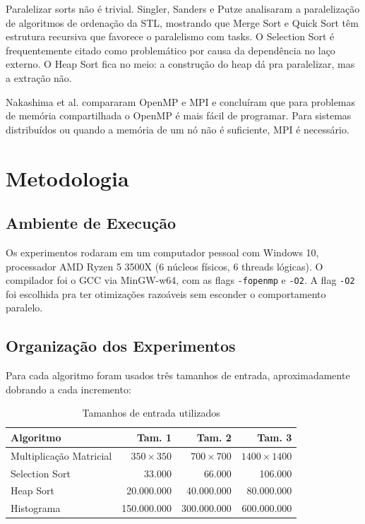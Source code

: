 \documentclass[12pt]{article}
\begin{document}
Paralelizar sorts não é trivial. Singler, Sanders e Putze \cite{singler2007} analisaram a paralelização de algoritmos de ordenação da STL, mostrando que Merge Sort e Quick Sort têm estrutura recursiva que favorece o paralelismo com tasks. O Selection Sort é frequentemente citado como problemático por causa da dependência no laço externo. O Heap Sort fica no meio: a construção do heap dá pra paralelizar, mas a extração não.

Nakashima et al. \cite{nakashima2012} compararam OpenMP e MPI e concluíram que para problemas de memória compartilhada o OpenMP é mais fácil de programar. Para sistemas distribuídos ou quando a memória de um nó não é suficiente, MPI é necessário.

\section{Metodologia}

\subsection{Ambiente de Execução}

Os experimentos rodaram em um computador pessoal com Windows 10, processador AMD Ryzen 5 3500X (6 núcleos físicos, 6 threads lógicas). O compilador foi o GCC via MinGW-w64, com as flags \texttt{-fopenmp} e \texttt{-O2}. A flag \texttt{-O2} foi escolhida pra ter otimizações razoáveis sem esconder o comportamento paralelo.

\subsection{Organização dos Experimentos}

Para cada algoritmo foram usados três tamanhos de entrada, aproximadamente dobrando a cada incremento:

\begin{table}[H]
\centering
\caption{Tamanhos de entrada utilizados}
\begin{tabular}{lrrr}
\toprule
\textbf{Algoritmo} & \textbf{Tam. 1} & \textbf{Tam. 2} & \textbf{Tam. 3} \\
\midrule
Multiplicação Matricial & $350\times350$ & $700\times700$ & $1400\times1400$ \\
Selection Sort & 33.000 & 66.000 & 106.000 \\
Heap Sort & 20.000.000 & 40.000.000 & 80.000.000 \\
Histograma & 150.000.000 & 300.000.000 & 600.000.000 \\
\bottomrule
\end{tabular}
\end{table}
\end{document}
